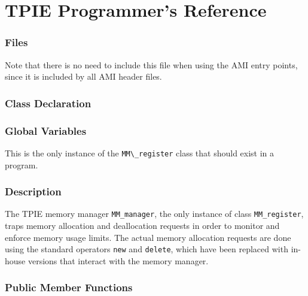 \chapter{TPIE Programmer's Reference}





\subsection{Files}
  \btabb
     {Note that there is no need to
include this file when using the AMI entry points, since it is included by
all AMI header files.}
  \etabb

\subsection{Class Declaration}
  \btabb
     {}
  \etabb

\subsection{Global Variables}
  \btabb
     {This is the only instance of
the \lstinline|MM\_register| class that should exist in a program.}
  \etabb

\subsection{Description}
The TPIE memory manager \lstinline|MM_manager|, the only instance of class
\lstinline|MM_register|, traps memory allocation and deallocation requests in
order to monitor and enforce memory usage limits. The actual memory
allocation requests are done using the standard \CPP{} operators \lstinline|new|
and \lstinline|delete|, which have been replaced with in-house versions that
interact with the memory manager.

\subsection{Public Member Functions}
  \btabb

